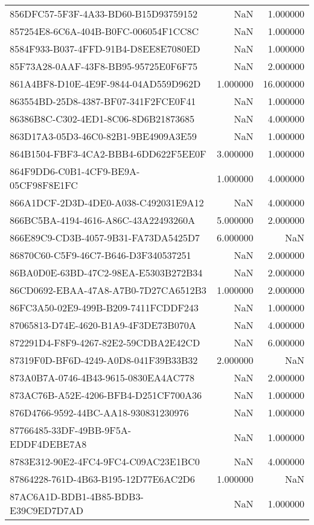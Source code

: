 \begin{tabular}{lrr}
856DFC57-5F3F-4A33-BD60-B15D93759152 & NaN & 1.000000 \\
857254E8-6C6A-404B-B0FC-006054F1CC8C & NaN & 1.000000 \\
8584F933-B037-4FFD-91B4-D8EE8E7080ED & NaN & 1.000000 \\
85F73A28-0AAF-43F8-BB95-95725E0F6F75 & NaN & 2.000000 \\
861A4BF8-D10E-4E9F-9844-04AD559D962D & 1.000000 & 16.000000 \\
863554BD-25D8-4387-BF07-341F2FCE0F41 & NaN & 1.000000 \\
86386B8C-C302-4ED1-8C06-8D6B21873685 & NaN & 4.000000 \\
863D17A3-05D3-46C0-82B1-9BE4909A3E59 & NaN & 1.000000 \\
864B1504-FBF3-4CA2-BBB4-6DD622F5EE0F & 3.000000 & 1.000000 \\
864F9DD6-C0B1-4CF9-BE9A-05CF98F8E1FC & 1.000000 & 4.000000 \\
866A1DCF-2D3D-4DE0-A038-C492031E9A12 & NaN & 4.000000 \\
866BC5BA-4194-4616-A86C-43A22493260A & 5.000000 & 2.000000 \\
866E89C9-CD3B-4057-9B31-FA73DA5425D7 & 6.000000 & NaN \\
86870C60-C5F9-46C7-B646-D3F340537251 & NaN & 2.000000 \\
86BA0D0E-63BD-47C2-98EA-E5303B272B34 & NaN & 2.000000 \\
86CD0692-EBAA-47A8-A7B0-7D27CA6512B3 & 1.000000 & 2.000000 \\
86FC3A50-02E9-499B-B209-7411FCDDF243 & NaN & 1.000000 \\
87065813-D74E-4620-B1A9-4F3DE73B070A & NaN & 4.000000 \\
872291D4-F8F9-4267-82E2-59CDBA2E42CD & NaN & 6.000000 \\
87319F0D-BF6D-4249-A0D8-041F39B33B32 & 2.000000 & NaN \\
873A0B7A-0746-4B43-9615-0830EA4AC778 & NaN & 2.000000 \\
873AC76B-A52E-4206-BFB4-D251CF700A36 & NaN & 1.000000 \\
876D4766-9592-44BC-AA18-930831230976 & NaN & 1.000000 \\
87766485-33DF-49BB-9F5A-EDDF4DEBE7A8 & NaN & 1.000000 \\
8783E312-90E2-4FC4-9FC4-C09AC23E1BC0 & NaN & 4.000000 \\
87864228-761D-4B63-B195-12D77E6AC2D6 & 1.000000 & NaN \\
87AC6A1D-BDB1-4B85-BDB3-E39C9ED7D7AD & NaN & 1.000000 \\

\end{tabular}

